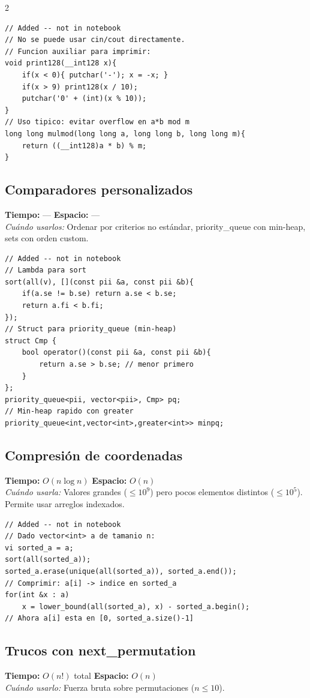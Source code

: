 \documentclass[10pt,a4paper]{article}
\begin{document}
\begin{multicols}{2}
\begin{lstlisting}
// Added -- not in notebook
// No se puede usar cin/cout directamente.
// Funcion auxiliar para imprimir:
void print128(__int128 x){
    if(x < 0){ putchar('-'); x = -x; }
    if(x > 9) print128(x / 10);
    putchar('0' + (int)(x % 10));
}
// Uso tipico: evitar overflow en a*b mod m
long long mulmod(long long a, long long b, long long m){
    return ((__int128)a * b) % m;
}
\end{lstlisting}

\subsection{Comparadores personalizados}
\textbf{Tiempo:} --- \quad \textbf{Espacio:} ---\\
\textit{Cu\'ando usarlos:} Ordenar por criterios no est\'andar, priority\_queue con min-heap, sets con orden custom.

\begin{lstlisting}
// Added -- not in notebook
// Lambda para sort
sort(all(v), [](const pii &a, const pii &b){
    if(a.se != b.se) return a.se < b.se;
    return a.fi < b.fi;
});
// Struct para priority_queue (min-heap)
struct Cmp {
    bool operator()(const pii &a, const pii &b){
        return a.se > b.se; // menor primero
    }
};
priority_queue<pii, vector<pii>, Cmp> pq;
// Min-heap rapido con greater
priority_queue<int,vector<int>,greater<int>> minpq;
\end{lstlisting}

\subsection{Compresi\'on de coordenadas}
\textbf{Tiempo:} $O(n \log n)$ \quad \textbf{Espacio:} $O(n)$\\
\textit{Cu\'ando usarla:} Valores grandes ($\leq 10^9$) pero pocos elementos distintos ($\leq 10^5$). Permite usar arreglos indexados.

\begin{lstlisting}
// Added -- not in notebook
// Dado vector<int> a de tamanio n:
vi sorted_a = a;
sort(all(sorted_a));
sorted_a.erase(unique(all(sorted_a)), sorted_a.end());
// Comprimir: a[i] -> indice en sorted_a
for(int &x : a)
    x = lower_bound(all(sorted_a), x) - sorted_a.begin();
// Ahora a[i] esta en [0, sorted_a.size()-1]
\end{lstlisting}

\subsection{Trucos con next\_permutation}
\textbf{Tiempo:} $O(n!)$ total \quad \textbf{Espacio:} $O(n)$\\
\textit{Cu\'ando usarlo:} Fuerza bruta sobre permutaciones ($n \leq 10$).


\end{multicols}
\end{document}
